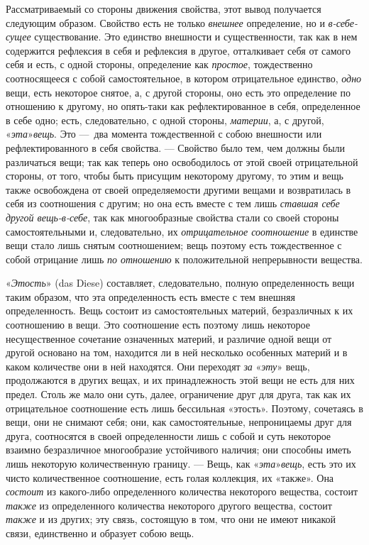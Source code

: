 Рассматриваемый со стороны движения свойства, этот вывод получается
следующим образом. Свойство есть не только
{\em внешнее} определение, но и
{\em в-себе-сущее} существование. Это единство
внешности и существенности, так как в нем содержится рефлексия в себя и
рефлексия в другое, отталкивает себя от самого себя и есть, с одной
стороны, определение как {\em простое}, тождественно
соотносящееся с собой самостоятельное, в котором отрицательное единство,
{\em одно} вещи, есть некоторое снятое, а, с другой
стороны, оно есть это определение по отношению к другому, но опять-таки как
рефлектированное в себя, определенное в себе одно; есть, следовательно, с
одной стороны, {\em материи}, а, с другой,
«{\em эта}»{\em  вещь}. Это —~два
момента тождественной с собою внешности или рефлектированного в себя
свойства. — Свойство было тем, чем должны были различаться вещи; так как
теперь оно освободилось от этой своей отрицательной стороны, от того, чтобы
быть присущим некоторому другому, то этим и вещь также освобождена от своей
определяемости другими вещами и возвратилась в себя из соотношения с
другим; но она есть вместе с тем лишь {\em ставшая себе
другой вещь-в-себе}, так как многообразные свойства стали со своей стороны
самостоятельными и, следовательно, их
{\em отрицательное соотношение} в единстве вещи стало
лишь снятым соотношением; вещь поэтому есть тождественное с собой отрицание
лишь {\em по отношению} к положительной непрерывности
вещества.

«{\em Этость}» (das Diese) составляет, следовательно,
полную определенность вещи таким образом, что эта определенность есть
вместе с тем внешняя определенность. Вещь состоит из самостоятельных
материй, безразличных к их соотношению в вещи. Это соотношение есть поэтому
лишь некоторое несущественное сочетание означенных материй, и различие
одной вещи от другой основано на том, находится ли в ней несколько
особенных материй и в каком количестве они в ней находятся. Они переходят
{\em за }«{\em эту}» вещь,
продолжаются в других вещах, и их принадлежность этой вещи не есть для них
предел. Столь же мало они суть, далее, ограничение друг для друга, так как
их отрицательное соотношение есть лишь бессильная «этость». Поэтому,
сочетаясь в вещи, они не снимают себя; они, как самостоятельные,
непроницаемы друг для друга, соотносятся в своей определенности лишь с
собой и суть некоторое взаимно безразличное многообразие устойчивого
наличия; они способны иметь лишь некоторую количественную границу. — Вещь,
как «{\em эта}»{\em  вещь}, есть
это их чисто количественное соотношение, есть голая коллекция, их «также».
Она {\em состоит} из какого-либо определенного
количества некоторого вещества, состоит {\em также} из
определенного количества некоторого другого вещества, состоит
{\em также} и из других; эту связь, состоящую в том,
что они не имеют никакой связи, единственно и образует собою вещь.

